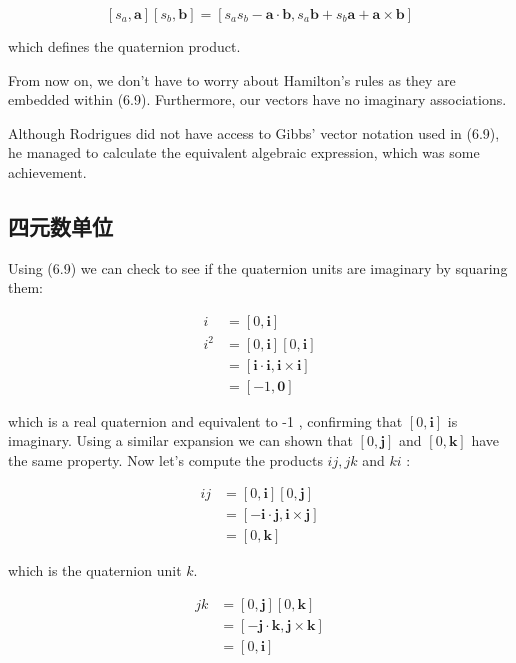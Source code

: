 $$
    \left[s_{a}, \mathbf{a}\right]\left[s_{b}, \mathbf{b}\right]=\left[s_{a} s_{b}-\mathbf{a} \cdot \mathbf{b}, s_{a} \mathbf{b}+s_{b} \mathbf{a}+\mathbf{a} \times \mathbf{b}\right]
$$

which defines the quaternion product.

From now on, we don't have to worry about Hamilton's rules as they are embedded within (6.9). Furthermore, our vectors have no imaginary associations.

Although Rodrigues did not have access to Gibbs' vector notation used in (6.9), he managed to calculate the equivalent algebraic expression, which was some achievement.

\subsection{四元数单位}
Using (6.9) we can check to see if the quaternion units are imaginary by squaring them:

$$
    \begin{aligned}
        i     & =[0, \mathbf{i}]                                             \\
        i^{2} & =[0, \mathbf{i}][0, \mathbf{i}]                              \\
              & =[\mathbf{i} \cdot \mathbf{i}, \mathbf{i} \times \mathbf{i}] \\
              & =[-1, \mathbf{0}]
    \end{aligned}
$$

which is a real quaternion and equivalent to -1 , confirming that $[0, \mathbf{i}]$ is imaginary. Using a similar expansion we can shown that $[0, \mathbf{j}]$ and $[0, \mathbf{k}]$ have the same property. Now let's compute the products $i j, j k$ and $k i$ :

$$
    \begin{aligned}
        i j & =[0, \mathbf{i}][0, \mathbf{j}]                               \\
            & =[-\mathbf{i} \cdot \mathbf{j}, \mathbf{i} \times \mathbf{j}] \\
            & =[0, \mathbf{k}]
    \end{aligned}
$$

which is the quaternion unit $k$.

$$
    \begin{aligned}
        j k & =[0, \mathbf{j}][0, \mathbf{k}]                               \\
            & =[-\mathbf{j} \cdot \mathbf{k}, \mathbf{j} \times \mathbf{k}] \\
            & =[0, \mathbf{i}]
    \end{aligned}
$$

